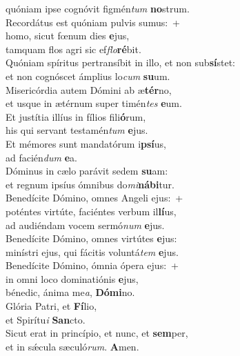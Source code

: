 \oddverse quóniam ipse cognóvit figmén\textit{tum} \textbf{no}strum.\\
\evenverse Recordátus est quóniam pulvis sumus:~+\\
\evenverse  homo, sicut fœnum dies \textbf{e}jus,~\*\\
\evenverse tamquam flos agri sic ef\textit{flo}\textbf{ré}bit.\\
\oddverse Quóniam spíritus pertransíbit in illo, et non sub\textbf{sí}stet:~\*\\
\oddverse et non cognóscet ámplius lo\textit{cum} \textbf{su}um.\\
\evenverse Misericórdia autem Dómini ab æ\textbf{tér}no,~\*\\
\evenverse et usque in ætérnum super timén\textit{tes} \textbf{e}um.\\
\oddverse Et justítia illíus in fílios fili\textbf{ó}rum,~\*\\
\oddverse his qui servant testamén\textit{tum} \textbf{e}jus.\\
\evenverse Et mémores sunt mandatórum i\textbf{psí}us,~\*\\
\evenverse ad facién\textit{dum} \textbf{e}a.\\
\oddverse Dóminus in cælo parávit sedem \textbf{su}am:~\*\\
\oddverse et regnum ipsíus ómnibus do\textit{mi}\textbf{ná}\textbf{bi}tur.\\
\evenverse Benedícite Dómino, omnes Angeli ejus:~+\\
\evenverse  poténtes virtúte, faciéntes verbum il\textbf{lí}us,~\*\\
\evenverse ad audiéndam vocem sermó\textit{num} \textbf{e}jus.\\
\oddverse Benedícite Dómino, omnes virtútes \textbf{e}jus:~\*\\
\oddverse minístri ejus, qui fácitis voluntá\textit{tem} \textbf{e}jus.\\
\evenverse Benedícite Dómino, ómnia ópera ejus:~+\\
\evenverse  in omni loco dominatiónis \textbf{e}jus,~\*\\
\evenverse bénedic, ánima me\textit{a}, \textbf{Dó}\textbf{mi}no.\\
\oddverse Glória Patri, et \textbf{Fí}lio,~\*\\
\oddverse et Spirítu\textit{i} \textbf{San}cto.\\
\evenverse Sicut erat in princípio, et nunc, et \textbf{sem}per,~\*\\
\evenverse et in sǽcula sæculó\textit{rum}. \textbf{A}men.\\
